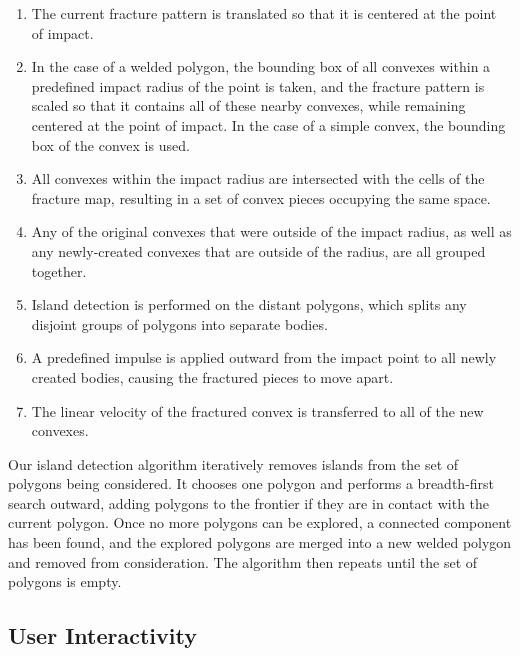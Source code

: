 \documentclass[tog]{acmsiggraph}
\begin{document}
\begin{enumerate}

\item The current fracture pattern is translated so that it is
  centered at the point of impact.

\item In the case of a welded polygon, the bounding box of all
  convexes within a predefined impact radius of the point is taken,
  and the fracture pattern is scaled so that it contains all of these
  nearby convexes, while remaining centered at the point of impact.
  In the case of a simple convex, the bounding box of the convex is
  used.

\item All convexes within the impact radius are intersected with the
  cells of the fracture map, resulting in a set of convex pieces
  occupying the same space.

\item Any of the original convexes that were outside of the impact
  radius, as well as any newly-created convexes that are outside of
  the radius, are all grouped together.

\item Island detection is performed on the distant polygons, which
  splits any disjoint groups of polygons into separate bodies.

\item A predefined impulse is applied outward from the impact point to
  all newly created bodies, causing the fractured pieces to move
  apart.

\item The linear velocity of the fractured convex is transferred to
  all of the new convexes.

\end{enumerate}

Our island detection algorithm iteratively removes islands from the
set of polygons being considered. It chooses one polygon and performs
a breadth-first search outward, adding polygons to the frontier if
they are in contact with the current polygon. Once no more polygons
can be explored, a connected component has been found, and the
explored polygons are merged into a new welded polygon and removed
from consideration. The algorithm then repeats until the set of
polygons is empty.

\subsection{User Interactivity}
\end{document}
